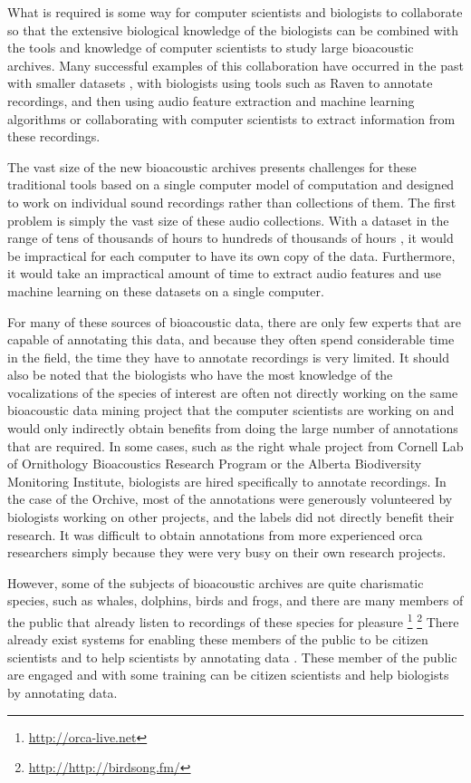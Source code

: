 \documentclass[12pt,oneside]{book}
\begin{document}
What is required is some way for computer scientists and biologists to
collaborate so that the extensive biological knowledge of the
biologists can be combined with the tools and knowledge of computer
scientists to study large bioacoustic archives.  Many successful
examples of this collaboration have occurred in the past with smaller
datasets \cite{yurkphd}, with biologists using tools such as Raven
\cite{cornell2011raven} to annotate recordings, and then using audio
feature extraction and machine learning algorithms
\cite{deecke1999quantifying} or collaborating with computer scientists
to extract information from these recordings.

The vast size of the new bioacoustic archives presents challenges for
these traditional tools based on a single computer model of
computation and designed to work on individual sound recordings rather
than collections of them. The first problem is simply the vast size of
these audio collections.  With a dataset in the range of tens of
thousands of hours \cite{ness2013orchive} to hundreds of thousands of
hours \cite{urazghildiiev2009rightwhale}, it would be impractical for
each computer to have its own copy of the data.  Furthermore, it would
take an impractical amount of time to extract audio features and use
machine learning on these datasets on a single computer.

For many of these sources of bioacoustic data, there are only few
experts that are capable of annotating this data, and because they
often spend considerable time in the field, the time they have to
annotate recordings is very limited.  It should also be noted that the
biologists who have the most knowledge of the vocalizations of the
species of interest are often not directly working on the same
bioacoustic data mining project that the computer scientists are
working on and would only indirectly obtain benefits from doing the
large number of annotations that are required.  In some cases, such as
the right whale project from Cornell Lab of Ornithology Bioacoustics
Research Program or the Alberta Biodiversity Monitoring Institute,
biologists are hired specifically to annotate recordings.  In the case
of the Orchive, most of the annotations were generously volunteered by
biologists working on other projects, and the labels did not directly
benefit their research.  It was difficult to obtain annotations from
more experienced orca researchers simply because they were very busy
on their own research projects.

However, some of the subjects of bioacoustic archives are quite
charismatic species, such as whales, dolphins, birds and frogs, and
there are many members of the public that already listen to recordings
of these species for pleasure \footnote{\url{http://orca-live.net}}
\footnote{\url{http://http://birdsong.fm/}} There already exist
systems for enabling these members of the public to be citizen
scientists \cite{anze08galaxyzoo} and to help scientists by annotating
data \cite{taylor2009neptune}.  These member of the public are engaged
and with some training can be citizen scientists and help biologists
by annotating data.
\end{document}
